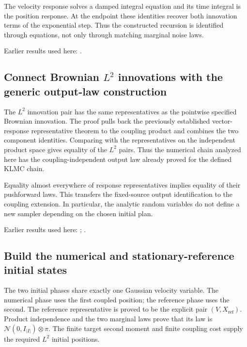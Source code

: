 \documentclass[11pt,a4paper]{report}
\begin{document}
The velocity response solves a damped integral equation and its time integral is the position response. At the endpoint these identities recover both innovation terms of the exponential step. Thus the constructed recursion is identified through equations, not only through matching marginal noise laws.



Earlier results used here: \cite[Section~3.17.1]{LangevinLean2026ULASC}.
\subsection{\texorpdfstring{Connect Brownian \(L^{2}\) innovations with the generic output-law construction}{Connect Brownian L² innovations with the generic output-law construction}}
\label{report-step-KineticLangevin-GenericCanonicalKLMC-lean-4}


The \(L^{2}\) innovation pair has the same representatives as the pointwise specified Brownian innovation. The proof pulls back the previously established vector-response representative theorem to the coupling product and combines the two component identities. Comparing with the representatives on the independent product space gives equality of the \(L^{2}\) pairs. Thus the numerical chain analyzed here has the coupling-independent output law already proved for the defined KLMC chain.



Equality almost everywhere of response representatives implies equality of their pushforward laws. This transfers the fixed-source output identification to the coupling extension. In particular, the analytic random variables do not define a new sampler depending on the chosen initial plan.



Earlier results used here: \cite[Section~3.17.1]{LangevinLean2026ULASC}; \cite[Section~3.8.17]{LangevinLean2026ULASC}.
\subsection{\texorpdfstring{Build the numerical and stationary-reference initial states}{Build the numerical and stationary-reference initial states}}
\label{report-step-KineticLangevin-GenericCanonicalKLMC-lean-5}


The two initial phases share exactly one Gaussian velocity variable. The numerical phase uses the first coupled position; the reference phase uses the second. The reference representative is proved to be the explicit pair \((V,X_\mathrm{ref})\). Product independence and the two marginal laws prove that its law is \(\mathcal N(0,I_{|I|})\otimes\pi\). The finite target second moment and finite coupling cost supply the required \(L^{2}\) initial positions.
\end{document}
